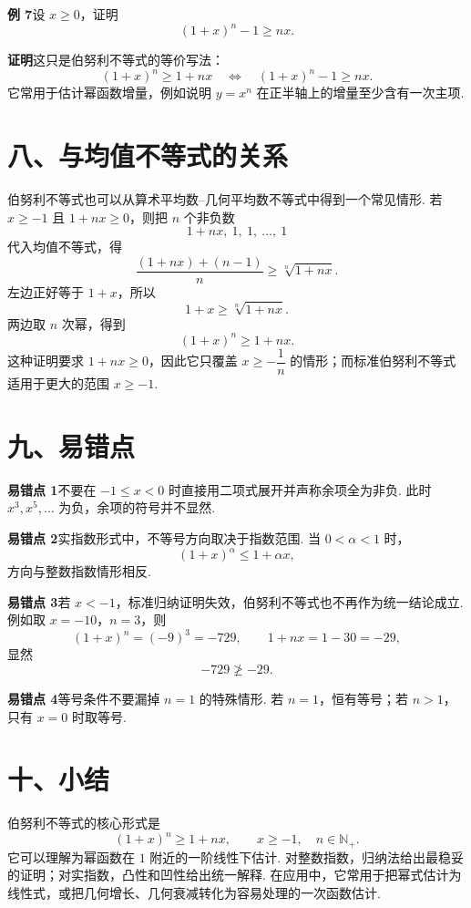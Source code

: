 \documentclass[UTF8, 12pt, fontset=fandol, oneside]{ctexart}
\begin{document}
\noindent\textbf{例 7}\quad 设 $x\ge0$，证明
\[
  (1+x)^n-1\ge nx.
\]

\noindent\textbf{证明}\quad 这只是伯努利不等式的等价写法：
\[
  (1+x)^n\ge1+nx
  \quad\Longleftrightarrow\quad
  (1+x)^n-1\ge nx.
\]
它常用于估计幂函数增量，例如说明 $y=x^n$ 在正半轴上的增量至少含有一次主项.

\section*{八、与均值不等式的关系}

伯努利不等式也可以从算术平均数--几何平均数不等式中得到一个常见情形. 若 $x\ge -1$ 且 $1+nx\ge0$，则把 $n$ 个非负数
\[
  1+nx,\ 1,\ 1,\ \ldots,\ 1
\]
代入均值不等式，得
\[
  \frac{(1+nx)+(n-1)}{n}\ge
  \sqrt[n]{1+nx}.
\]
左边正好等于 $1+x$，所以
\[
  1+x\ge\sqrt[n]{1+nx}.
\]
两边取 $n$ 次幂，得到
\[
  (1+x)^n\ge1+nx.
\]
这种证明要求 $1+nx\ge0$，因此它只覆盖 $x\ge-\dfrac1n$ 的情形；而标准伯努利不等式适用于更大的范围 $x\ge-1$.

\section*{九、易错点}

\noindent\textbf{易错点 1}\quad 不要在 $-1\le x<0$ 时直接用二项式展开并声称余项全为非负. 此时 $x^3,x^5,\ldots$ 为负，余项的符号并不显然.

\noindent\textbf{易错点 2}\quad 实指数形式中，不等号方向取决于指数范围. 当 $0<\alpha<1$ 时，
\[
  (1+x)^\alpha\le1+\alpha x,
\]
方向与整数指数情形相反.

\noindent\textbf{易错点 3}\quad 若 $x<-1$，标准归纳证明失效，伯努利不等式也不再作为统一结论成立. 例如取 $x=-10$，$n=3$，则
\[
  (1+x)^n=(-9)^3=-729,\qquad 1+nx=1-30=-29,
\]
显然
\[
  -729\not\ge -29.
\]

\noindent\textbf{易错点 4}\quad 等号条件不要漏掉 $n=1$ 的特殊情形. 若 $n=1$，恒有等号；若 $n>1$，只有 $x=0$ 时取等号.

\section*{十、小结}

伯努利不等式的核心形式是
\[
  (1+x)^n\ge1+nx,\qquad x\ge-1,\quad n\in\mathbb N_+.
\]
它可以理解为幂函数在 $1$ 附近的一阶线性下估计. 对整数指数，归纳法给出最稳妥的证明；对实指数，凸性和凹性给出统一解释. 在应用中，它常用于把幂式估计为线性式，或把几何增长、几何衰减转化为容易处理的一次函数估计.
\end{document}
